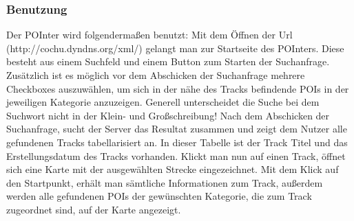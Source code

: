 \subsubsection{Benutzung}
Der POInter wird folgendermaßen benutzt:
Mit dem Öffnen der Url (http://cochu.dyndns.org/xml/) gelangt man zur Startseite des POInters.
Diese besteht aus einem Suchfeld und einem Button zum Starten der Suchanfrage.
Zusätzlich ist es möglich vor dem Abschicken der Suchanfrage mehrere Checkboxes auszuwählen,
um sich in der nähe des Tracks befindende POIs in der jeweiligen Kategorie anzuzeigen.
Generell unterscheidet die Suche bei dem Suchwort nicht in der Klein- und Großschreibung!
Nach dem Abschicken der Suchanfrage, sucht der Server das Resultat zusammen und zeigt dem Nutzer alle gefundenen
Tracks tabellarisiert an.
In dieser Tabelle ist der Track Titel und das Erstellungsdatum des Tracks vorhanden.
Klickt man nun auf einen Track, öffnet sich eine Karte mit der ausgewählten Strecke eingezeichnet.
Mit dem Klick auf den Startpunkt, erhält man sämtliche Informationen zum Track, außerdem werden alle
gefundenen POIs der gewünschten Kategorie, die zum Track zugeordnet sind, auf der Karte angezeigt.
